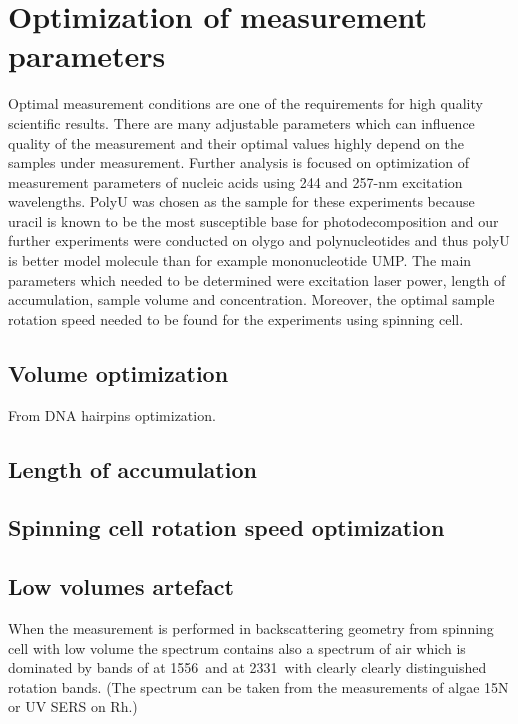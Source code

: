 \section{Optimization of measurement parameters}

Optimal measurement conditions are one of the requirements for high quality
scientific results. There are many adjustable parameters which can influence
quality of the measurement and their optimal values highly depend on the
samples under measurement. Further analysis is focused on optimization of
measurement parameters of nucleic acids using 244 and 257-nm excitation
wavelengths. PolyU was chosen as the sample for these experiments because
uracil is known to be the most susceptible base for photodecomposition and our
further experiments were conducted on olygo and polynucleotides and thus polyU
is better model molecule than for example mononucleotide UMP. The main
parameters which needed to be determined were excitation laser power, length of
accumulation, sample volume and concentration. Moreover, the optimal sample
rotation speed needed to be found for the experiments using spinning cell.




\subsection{Volume optimization}
From DNA hairpins optimization.
\subsection{Length of accumulation}
\subsection{Spinning cell rotation speed optimization}
\subsection{Low volumes artefact}
When the measurement is performed in backscattering geometry from spinning cell
with low volume the spectrum contains also a spectrum of air which is dominated
by bands of  at 1556\,\icm{} and  at 2331\,\icm{} with clearly
clearly distinguished rotation bands. (The spectrum can be taken from the
measurements of algae 15N or UV SERS on Rh.)
